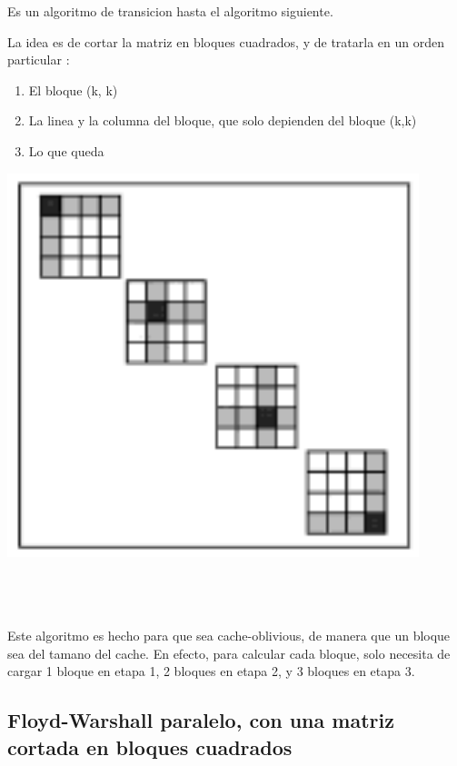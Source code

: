 \documentclass[a4paper,11pt]{article}
\begin{document}
Es un algoritmo de transicion hasta el algoritmo siguiente.

La idea es de cortar la matriz en bloques cuadrados, y de tratarla en un orden particular :

\begin{minipage}{0.50\linewidth}
  \begin{enumerate}
    \item El bloque (k, k)
    \item La linea y la columna del bloque, que solo depienden del bloque (k,k)
    \item Lo que queda
  \end{enumerate}
\end{minipage}\hfill
\begin{minipage}{0.4\linewidth}
  \begin{center}
    \includegraphics[scale=0.5]{FW_SEQ_TILED2.png}
  \end{center}
\end{minipage}
~\\\\\\
\indent Este algoritmo es hecho para que sea cache-oblivious, de manera que un bloque sea del tamano del cache. En efecto, para calcular cada bloque, solo necesita de cargar 1 bloque en etapa 1, 2 bloques en etapa 2, y 3 bloques en etapa 3.

\subsection{Floyd-Warshall paralelo, con una matriz cortada en bloques cuadrados}
\end{document}
